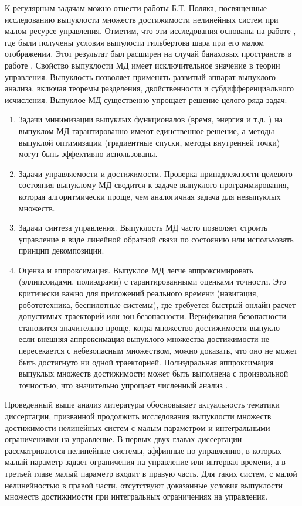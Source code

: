 \documentclass[../main.tex]{subfiles}
\begin{document}
К регулярным задачам можно отнести работы Б.Т. Поляка, посвященные исследованию выпуклости множеств достижимости нелинейных систем при малом ресурсе управления.
Отметим, что эти исследования основаны на работе \cite{Polyak2001}, где были получены условия выпулости гильбертова шара при его малом отображении. 
Этот результат был расширен на случай банаховых пространств в работе \cite{Ledyaev}.
Свойство выпуклости МД имеет исключительное значение в теории управления. 
Выпуклость позволяет применять развитый аппарат выпуклого анализа, включая теоремы разделения, двойственности и субдифференциального исчисления.
Выпуклое МД существенно упрощает решение целого ряда задач:
\begin{enumerate}
	\item Задачи минимизации выпуклых функционалов (время, энергия и т.д. ) на выпуклом МД гарантированно имеют единственное решение, а методы выпуклой оптимизации (градиентные спуски, методы внутренней точки) могут быть эффективно использованы.
	\item Задачи управляемости и достижимости. 
	Проверка принадлежности целевого состояния выпуклому МД сводится к задаче выпуклого программирования, которая алгоритмически проще, чем аналогичная задача для невыпуклых множеств.
	\item Задачи синтеза управления. 
	Выпуклость МД часто позволяет строить управление в виде линейной обратной связи по состоянию или использовать принцип декомпозиции.
	\item Оценка и аппроксимация. 
	Выпуклое МД легче аппроксимировать (эллипсоидами, полиэдрами) с гарантированными оценками точности. 
	Это критически важно для приложений реального времени (навигация,  робототехника, беспилотные системы), где требуется быстрый онлайн-расчет допустимых траекторий или зон безопасности. 
	Верификация безопасности становится значительно проще, когда множество достижимости выпукло — если внешняя аппроксимация выпуклого множества достижимости не пересекается с небезопасным множеством, можно доказать, что оно не может быть достигнуто ни одной траекторией. 
	Полиэдральная аппроксимация выпуклых множеств достижимости может быть выполнена с произвольной точностью, что значительно упрощает численный анализ .
\end{enumerate}

Проведенный выше анализ литературы обосновывает актуальность тематики диссертации, призванной продолжить исследования выпуклости множеств достижимости нелинейных систем с малым параметром и интегральными ограничениями на управление.  
В первых двух главах диссертации рассматриваются нелинейные системы, аффинные по управлению, в которых малый параметр задает ограничения на управление или интервал времени, а в третьей главе малый параметр входит в правую часть.  
Для таких систем, с малой нелинейностью в правой части,  отсутствуют доказанные условия выпуклости множеств достижимости при интегральных ограничениях на управления.
\end{document}
